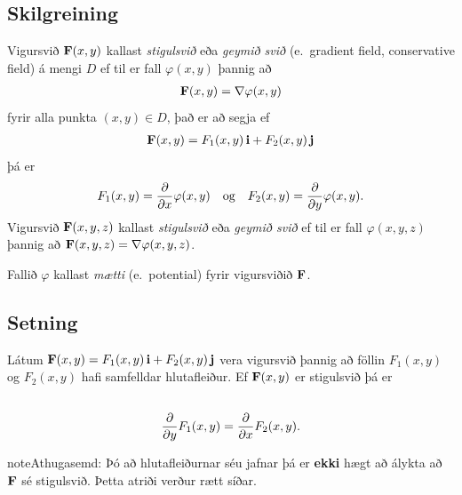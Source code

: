 \documentclass[a4paper,10pt,icelandic]{sphinxmanual}
\begin{document}
\subsection{Skilgreining}
\label{Kafli5:id3}
Vigursvið \(\mbox{${\bf F}$}(x,y)\) kallast \emph{stigulsvið} eða \emph{geymið
svið} (e. gradient field, conservative field) á mengi \(D\) ef til
er fall \(\varphi(x,y)\) þannig að
\begin{gather}
\begin{split}\displaystyle \mbox{${\bf F}$}(x,y)=\nabla\varphi(x,y)\end{split}\notag
\end{gather}
fyrir alla punkta \((x,y)\in D\), það er að segja ef
\begin{gather}
\begin{split}\displaystyle \mbox{${\bf F}$}(x,y)=F_1(x,y)\,\mbox{${\bf i}$}+F_2(x,y)\,\mbox{${\bf j}$}\end{split}\notag
\end{gather}
þá er
\begin{gather}
\begin{split}\displaystyle F_1(x,y)=\frac{\partial}{\partial x}\varphi(x,y) \quad \text{og}\quad  F_2(x,y)=\frac{\partial}{\partial y}\varphi(x,y).\end{split}\notag
\end{gather}
Vigursvið \(\mbox{${\bf F}$}(x,y,z)\) kallast \emph{stigulsvið} eða
\emph{geymið svið} ef til er fall \(\varphi(x,y,z)\) þannig að
\(\mbox{${\bf F}$}(x,y,z)=\nabla\varphi(x,y,z)\).

Fallið \(\varphi\) kallast \emph{mætti} (e. potential) fyrir vigursviðið
\(\mbox{${\bf F}$}\).


\subsection{Setning}
\label{Kafli5:setning}
Látum
\(\mbox{${\bf F}$}(x,y)=F_1(x,y)\,\mbox{${\bf i}$}+F_2(x,y)\,\mbox{${\bf j}$}\)
vera vigursvið þannig að föllin \(F_1(x,y)\) og \(F_2(x,y)\)
hafi samfelldar hlutafleiður. Ef \(\mbox{${\bf F}$}(x,y)\) er
stigulsvið þá er
\begin{gather}
\begin{split}\displaystyle\end{split}\notag\\\begin{split}\frac{\partial}{\partial y}F_1(x,y)=
\frac{\partial}{\partial x}F_2(x,y).\end{split}\notag
\end{gather}
\begin{notice}{note}{Athugasemd:}
Þó að hlutafleiðurnar séu jafnar þá er \textbf{ekki} hægt að álykta að \(\mbox{${\bf F}$}\) sé stigulsvið. Þetta atriði verður rætt síðar.
\end{notice}
\end{document}
